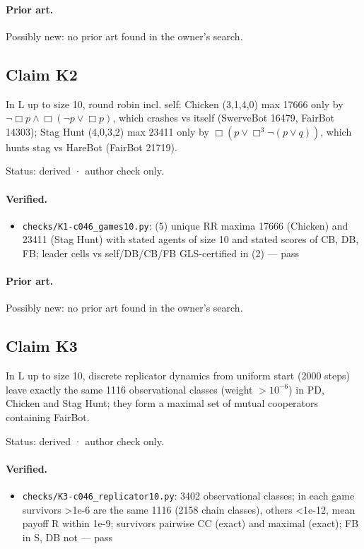 \documentclass{article}
\begin{document}
\paragraph{Prior art.} Possibly new: no prior art found in the owner's search.

\subsection*{Claim K2}

In L up to size 10, round robin incl. self: Chicken (3,1,4,0) max 17666 only by $\neg\Box p\wedge\Box(\neg p\vee\Box p)$, which crashes vs itself (SwerveBot 16479, FairBot 14303); Stag Hunt (4,0,3,2) max 23411 only by $\Box(p\vee\Box^3\neg(p\vee q))$, which hunts stag vs HareBot (FairBot 21719).

Status: derived · author check only.

\paragraph{Verified.}
\begin{itemize}
\item \texttt{checks/K1-c046\_games10.py}: (5) unique RR maxima 17666 (Chicken) and 23411 (Stag Hunt) with stated agents of size 10 and stated scores of CB, DB, FB; leader cells vs self/DB/CB/FB GLS-certified in (2) --- pass
\end{itemize}

\paragraph{Prior art.} Possibly new: no prior art found in the owner's search.

\subsection*{Claim K3}

In L up to size 10, discrete replicator dynamics from uniform start (2000 steps) leave exactly the same 1116 observational classes (weight $>10^{-6}$) in PD, Chicken and Stag Hunt; they form a maximal set of mutual cooperators containing FairBot.

Status: derived · author check only.

\paragraph{Verified.}
\begin{itemize}
\item \texttt{checks/K3-c046\_replicator10.py}: 3402 observational classes; in each game survivors \textgreater{}1e-6 are the same 1116 (2158 chain classes), others \textless{}1e-12, mean payoff R within 1e-9; survivors pairwise CC (exact) and maximal (exact); FB in S, DB not --- pass
\end{itemize}
\end{document}
